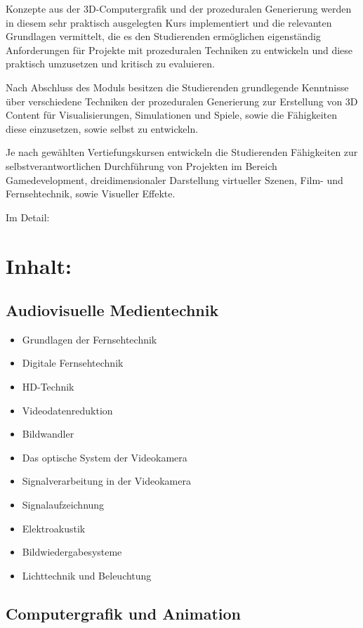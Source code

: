 Konzepte aus der 3D-Computergrafik und der prozeduralen Generierung
werden in diesem sehr praktisch ausgelegten Kurs implementiert und die
relevanten Grundlagen vermittelt, die es den Studierenden ermöglichen
eigenständig Anforderungen für Projekte mit prozeduralen Techniken zu
entwickeln und diese praktisch umzusetzen und kritisch zu evaluieren.

Nach Abschluss des Moduls besitzen die Studierenden grundlegende
Kenntnisse über verschiedene Techniken der prozeduralen Generierung zur
Erstellung von 3D Content für Visualisierungen, Simulationen und Spiele,
sowie die Fähigkeiten diese einzusetzen, sowie selbst zu entwickeln.

Je nach gewählten Vertiefungskursen entwickeln die Studierenden
Fähigkeiten zur selbstverantwortlichen Durchführung von Projekten im
Bereich Gamedevelopment, dreidimensionaler Darstellung virtueller
Szenen, Film- und Fernsehtechnik, sowie Visueller Effekte.

Im Detail:

\section*{Inhalt:}\label{inhalt-29}

\subsection*{Audiovisuelle
Medientechnik}\label{audiovisuelle-medientechnik-1}

\begin{itemize}
\item
  Grundlagen der Fernsehtechnik
\item
  Digitale Fernsehtechnik
\item
  HD-Technik
\item
  Videodatenreduktion
\item
  Bildwandler
\item
  Das optische System der Videokamera
\item
  Signalverarbeitung in der Videokamera
\item
  Signalaufzeichnung
\item
  Elektroakustik
\item
  Bildwiedergabesysteme
\item
  Lichttechnik und Beleuchtung
\end{itemize}

\subsection*{Computergrafik und
Animation}\label{computergrafik-und-animation-1}

